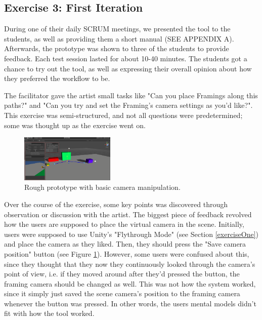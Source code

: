 \subsection{Exercise 3: First Iteration}
During one of their daily SCRUM meetings, we presented the tool to the students, as well as providing them a short manual (SEE APPENDIX A). Afterwards, the prototype was shown to three of the students to provide feedback. Each test session lasted for about 10-40 minutes. The students got a chance to try out the tool, as well as expressing their overall opinion about how they preferred the workflow to be.

The facilitator gave the artist small tasks like "Can you place Framings along this paths?" and "Can you try and set the Framing's camera settings as you'd like?". This exercise was semi-structured, and not all questions were predetermined; some was thought up as the exercise went on.

\begin{figure}[htbp]
\centering
\includegraphics[width=0.40\textwidth]{Pics/MainSetup}
\caption{Rough prototype with basic camera manipulation.}
\label{fig:prototype}
\end{figure}

Over the course of the exercise, some key points was discovered through observation or discussion with the artist. The biggest piece of feedback revolved how the users are supposed to place the virtual camera in the scene. Initially, users were supposed to use Unity's "Flythrough Mode" (see Section \ref{exerciseOne}) and place the camera as they liked. Then, they should press the "Save camera position" button (see Figure \ref{fig:prototype}). However, some users were confused about this, since they thought that they now they continuously looked through the camera's point of view, i.e. if they moved around after they'd pressed the button, the framing camera should be changed as well. This was not how the system worked, since it simply just saved the scene camera's position to the framing camera whenever the button was pressed. In other words, the users mental models didn't fit with how the tool worked.
